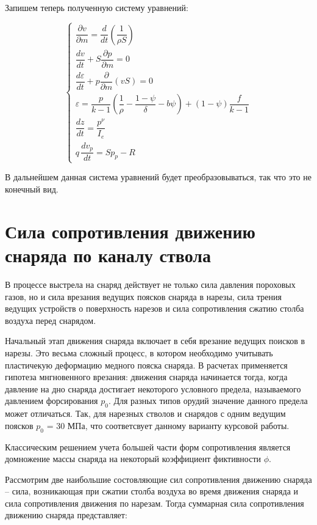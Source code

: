 \documentclass[14pt, a4paper]{report} %
\begin{document}
Запишем теперь полученную систему уравнений: 

\[
\left\{
\begin{array}{l}
\dfrac{\partial v}{\partial m} = \dfrac{d}{dt}\left(\dfrac{1}{\rho S}\right) \\[1.5ex]
\dfrac{dv}{dt} + S\dfrac{\partial p}{\partial m} = 0 \\[1.5ex]
\dfrac{d\varepsilon}{dt} + p\dfrac{\partial}{\partial m}(vS) = 0 \\[1.5ex]
\varepsilon = \dfrac{p}{k - 1} \left( \dfrac{1}{\rho} - \dfrac{1 - \psi}{\delta} - b \psi \right) + (1 - \psi) \dfrac{f}{k - 1} \\[1.5ex]
\dfrac{dz}{dt} = \dfrac{p^\nu}{I_e} \\[1.5ex]
q \, \dfrac{d v_{p}}{d t} = S p_{p} - R
\end{array}
\right.
\]

В дальнейшем данная система уравнений будет преобразовываться, так что это не конечный вид.

\section{Сила сопротивления движению снаряда по каналу ствола}

В процессе выстрела на снаряд действует не только сила давления пороховых газов, но и сила врезания ведущих поясков снаряда в нарезы, сила трения ведущих устройств о поверхность нарезов и сила сопротивления сжатию столба воздуха перед снарядом. 

Начальный этап движения снаряда включает в себя врезание ведущих поисков в нарезы. Это весьма сложный процесс, в котором необходимо учитывать пластичекую деформацию медного пояска снаряда. В расчетах применяется гипотеза мнгновенного врезания: движения снаряда начинается тогда, когда давление на дно снаряда достигает 
некоторого условного предела, называемого давлением форсирования $p_0$. Для разных типов орудий значение данного предела может отличаться. Так, для нарезных стволов и снарядов с одним ведущим поясков $p_0$ = 30 МПа, что соответсвует данному варианту курсовой работы.

Классическим решением учета большей части форм сопротивления является домножение массы снаряда на некоторый коэффициент фиктивности $\phi$.

Рассмотрим две наибольшие состовляющие сил сопротивления движению снаряда -- сила, возникающая при сжатии столба воздуха во время движения снаряда и сила сопротивления движения по нарезам. Тогда суммарная сила сопротивления
движению снаряда представляет: 
\end{document}

